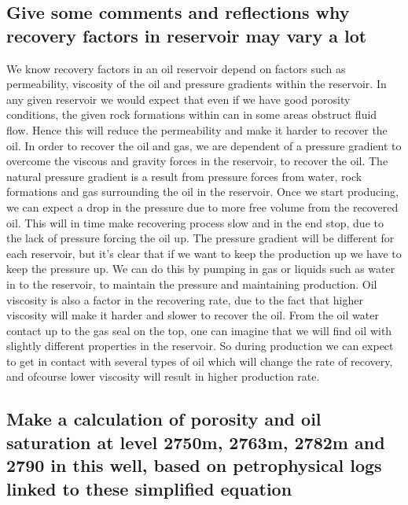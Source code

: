 \documentclass[a4paper,norsk]{article}
\begin{document}
\subsection*{Give some comments and reflections why recovery factors in reservoir may vary a lot}
We know recovery factors in an oil reservoir depend on factors such as permeability, viscosity of the oil and pressure gradients within the reservoir. \newline
\indent In any given reservoir we would expect that even if we have good porosity conditions, the given rock formations within can in some areas obstruct fluid flow. Hence this will reduce the permeability and make it harder to recover the oil. 
\newline \indent In order to recover the oil and gas, we are dependent of a pressure gradient to overcome the viscous and gravity forces in the reservoir, to recover the oil. The natural pressure gradient is a result from pressure forces from water, rock formations and gas surrounding the oil in the reservoir. Once we start producing, we can expect a drop in the pressure due to more free volume from the recovered oil. This will in time make recovering process slow and in the end stop, due to the lack of pressure forcing the oil up. The pressure gradient will be different for each reservoir, but it's clear that if we want to keep the production up we have to keep the pressure up. We can do this by pumping in gas or liquids such as water in to the reservoir, to maintain the pressure and maintaining production.
\newline \indent Oil viscosity is also a factor in the recovering rate, due to the fact that higher viscosity will make it harder and slower to recover the oil. From the oil water contact up to the gas seal on the top, one can imagine that we will find oil with slightly different properties in the reservoir. So during production we can expect to get in contact with several types of oil which will change the rate of recovery, and ofcourse lower viscosity will result in higher production rate.

\subsection*{Make a calculation of porosity and oil saturation at level 2750m, 2763m, 2782m and 2790 in this well, based on petrophysical logs linked to these simplified equation}
\end{document}
